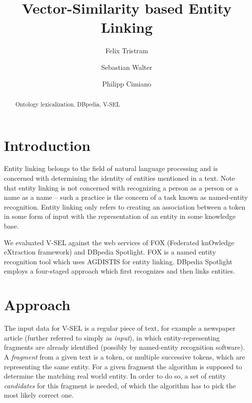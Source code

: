 \documentclass[runningheads,a4paper]{llncs}
\newcommand{\keywords}[1]{\par\addvspace\baselineskip
\noindent\keywordname\enspace\ignorespaces#1}
\begin{document}
\mainmatter  %

\newcommand{\acronym}{V-SEL}



\title{Vector-Similarity based Entity Linking}

\author{Felix Tristram \and Sebastian Walter \and Philipp Cimiano}



\maketitle


\begin{abstract}


\keywords{Ontology lexicalization, DBpedia, \acronym{}}
\end{abstract}

\section{Introduction}\label{sec:introduction}
Entity linking belongs to the field of natural language processing and is concerned with determining the identity of entities mentioned in a text. Note that entity linking is not concerned with recognizing a person as a person or a name as a name -- such a practice is the concern of a task known as named-entity recognition. Entity linking only refers to creating an association between a token in some form of input with the representation of an entity in some knowledge base.

We evaluated V-SEL against the web services of FOX (Federated knOwledge eXtraction framework) and DBpedia Spotlight. FOX is a named entity recognition tool which uses AGDISTIS for entity linking. DBpedia Spotlight employs a four-staged approach which first recognizes and then links entities.


\section{Approach}\label{sec:approach}
The input data for {\acronym} is a regular piece of text, for example a newspaper article (further referred to simply as \textit{input}), in which entity-representing fragments are already identified (possibly by named-entity recognition software). A \textit{fragment} from a given text is a token, or multiple successive tokens, which are representing the same entity. For a given fragment the algorithm is supposed to determine the matching real world entity. In order to do so, a set of entity \textit{candidates} for this fragment is needed, of which the algorithm has to pick the most likely correct one. 
\end{document}
